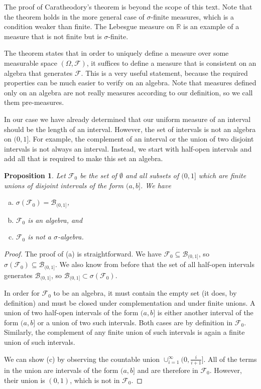 \documentclass{book}
\theoremstyle{plain}%
\newtheorem{proposition}{Proposition}[section]
\theoremstyle{definition}
\begin{document}
The proof of Caratheodory's theorem is beyond the scope of this text. Note that the theorem holds in the more general case of $\sigma$-finite measures, which is a condition weaker than finite. The Lebesgue measure on $\mathbb{R}$ is an example of a measure that is not finite but is $\sigma$-finite.

The theorem states that in order to uniquely define a measure over some measurable space $(\Omega, \mathcal{F})$, it suffices to define a measure that is consistent on an algebra that generates $\mathcal{F}$. This is a very useful statement, because the required properties can be much easier to verify on an algebra. Note that measures defined only on an algebra are not really measures according to our definition, so we call them pre-measures.

In our case we have already determined that our uniform measure of an interval should be the length of an interval. However, the set of intervals is not an algebra on $(0,1]$. For example, the complement of an interval or the union of two disjoint intervals is not always an interval. Instead, we start with half-open intervals and add all that is required to make this set an algebra.

\begin{proposition} Let $\mathcal{F}_0$ be the set of $\emptyset$ and all subsets of $(0, 1]$ which are finite unions of disjoint intervals of the form $(a, b]$. We have

\begin{enumerate}[(a)]
\item $\sigma(\mathcal{F}_0) = \mathcal{B}_{(0,1]} $,
\item $\mathcal{F}_0$ is an algebra, and
\item $\mathcal{F}_0$ is not a $\sigma$-algebra.
\end{enumerate}
\end{proposition}

\begin{proof}
The proof of (a) is straightforward. We have $\mathcal{F}_0 \subseteq \mathcal{B}_{(0,1]}$, so $\sigma(\mathcal{F}_0) \subseteq \mathcal{B}_{(0,1]}$. We also know from before that the set of all half-open intervals generates $\mathcal{B}_{(0,1]}$, so $\mathcal{B}_{(0,1]} \subset \sigma(\mathcal{F}_0)$.

In order for $\mathcal{F}_0$ to be an algebra, it must contain the empty set (it does, by definition) and must be closed under complementation and under finite unions. A union of two half-open intervals of the form $(a, b]$ is either another interval of the form $(a, b]$ or a union of two such intervals. Both cases are by definition in $\mathcal{F}_0$. Similarly, the complement of any finite union of such intervals is again a finite union of such intervals.

We can show (c) by observing the countable union $\cup_{i=1}^\infty (0, \frac{i}{i+1}]$. All of the terms in the union are intervals of the form $(a, b]$ and are therefore in $\mathcal{F}_0$. However, their union is $(0, 1)$, which is not in $\mathcal{F}_0$.
\end{proof}
\end{document}

